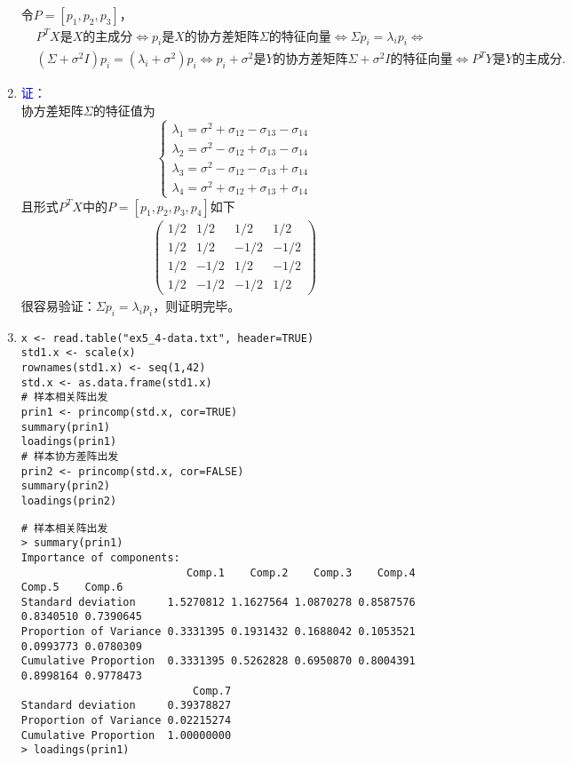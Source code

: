 \begin{enumerate}
        令$P=[p_1,p_2,p_3]$，\begin{align*}
            & P^TX\text{是}X\text{的主成分} \iff p_i\text{是}X\text{的协方差矩阵}\Sigma\text{的特征向量}\iff \Sigma p_i=\lambda_i p_i \iff \\
            & (\Sigma+\sigma^2 I)p_i=(\lambda_i+\sigma^2)p_i \iff p_i+\sigma^2\text{是}Y\text{的协方差矩阵}\Sigma+\sigma^2I\text{的特征向量} \iff P^TY\text{是}Y\text{的主成分}.
        \end{align*}
        \item
        {\kaishu\textcolor{blue}{证：}}\\
        协方差矩阵$\Sigma$的特征值为
        \[\begin{cases}
            \lambda_1=\sigma^2+\sigma_{12}-\sigma_{13}-\sigma_{14}\\
            \lambda_2=\sigma^2-\sigma_{12}+\sigma_{13}-\sigma_{14}\\
            \lambda_3=\sigma^2-\sigma_{12}-\sigma_{13}+\sigma_{14}\\
            \lambda_4=\sigma^2+\sigma_{12}+\sigma_{13}+\sigma_{14}
            \end{cases}\]
        且形式$P^TX$中的$P=[p_1,p_2,p_3,p_4]$如下
        \[\begin{array}{cccc}\left(
            \begin{matrix}
            1/2 & 1/2 & 1/2 & 1/2\\
            1/2 & 1/2 & -1/2 & -1/2\\
            1/2 & -1/2 & 1/2 & -1/2\\
            1/2 & -1/2 & -1/2 & 1/2
            \end{matrix}
            \right)\end{array}\]
        很容易验证：$\Sigma p_i=\lambda_i p_i$，则证明完毕。
        \item
        \code
\begin{lstlisting}
x <- read.table("ex5_4-data.txt", header=TRUE)
std1.x <- scale(x)
rownames(std1.x) <- seq(1,42)
std.x <- as.data.frame(std1.x)
# 样本相关阵出发
prin1 <- princomp(std.x, cor=TRUE)
summary(prin1)
loadings(prin1)
# 样本协方差阵出发
prin2 <- princomp(std.x, cor=FALSE)
summary(prin2)
loadings(prin2)
\end{lstlisting}
        \out
\begin{lstlisting}
# 样本相关阵出发
> summary(prin1)
Importance of components:
                          Comp.1    Comp.2    Comp.3    Comp.4    Comp.5    Comp.6
Standard deviation     1.5270812 1.1627564 1.0870278 0.8587576 0.8340510 0.7390645
Proportion of Variance 0.3331395 0.1931432 0.1688042 0.1053521 0.0993773 0.0780309
Cumulative Proportion  0.3331395 0.5262828 0.6950870 0.8004391 0.8998164 0.9778473
                           Comp.7
Standard deviation     0.39378827
Proportion of Variance 0.02215274
Cumulative Proportion  1.00000000
> loadings(prin1)


\end{lstlisting}
\end{enumerate}
